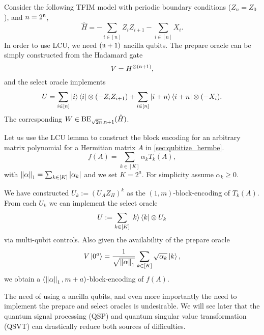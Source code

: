 \begin{exam}
Consider the following TFIM model with periodic boundary conditions ($Z_{n}=Z_0$), and $n=2^{\mathfrak{n}}$,
\begin{equation}
\hat{H}=-\sum_{i\in[n]} Z_iZ_{i+1}-\sum_{i\in[n]} X_i.
\end{equation}
In order to use LCU, we need $(\mathfrak{n}+1)$ ancilla qubits.
The prepare oracle can be simply constructed from the Hadamard gate
\begin{equation}
V=H^{\otimes(\mathfrak{n}+1)},
\end{equation}
and the select oracle implements
\begin{equation}
U=\sum_{i\in[n]}\ket{i}\bra{i}\otimes (-Z_iZ_{i+1}) + \sum_{i\in[n]}\ket{i+n}\bra{i+n}\otimes (-X_i).
\end{equation}
The corresponding $W\in\operatorname{BE}_{\sqrt{2n},\mathfrak{n}+1}(\hat{H})$.
\end{exam}

\begin{exam}
Let us use the LCU lemma to construct the block encoding for an arbitrary matrix polynomial for a Hermitian matrix $A$ in \cref{sec:qubitize_hermbe}.
\begin{equation}
f(A)=\sum_{k\in[K]} \alpha_k T_k(A),
\end{equation}
with $\left\lVert\alpha\right\rVert_1=\sum_{k\in[K]} |\alpha_k|$ and we set $K=2^{a}$. For simplicity assume $\alpha_k\ge 0$. 

We have constructed $U_k:=(U_A Z_{\Pi})^k$ as the $(1,m)$-block-encoding of $T_k(A)$. From each $U_k$ we can implement the select oracle
\begin{equation}
U:=\sum_{k\in[K]} \ket{k}\bra{k}\otimes U_k
\end{equation}
via multi-qubit controls.
Also given the availability of the prepare oracle
\begin{equation}
V\ket{0^{a}}=\frac{1}{\sqrt{\left\lVert\alpha\right\rVert_1}}\sum_{k\in[K]} \sqrt{\alpha_k}\ket{k},
\end{equation}
we obtain a $(\left\lVert\alpha\right\rVert_1,m+a)$-block-encoding of $f(A)$.

The need of using $a$ ancilla qubits, and even more importantly the need to implement the prepare and select oracles is undesirable.
We will see later that the quantum signal processing (QSP) and quantum singular value transformation (QSVT) can drastically reduce both sources of difficulties.
\end{exam}

